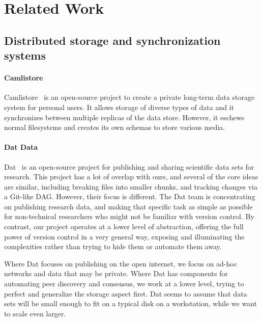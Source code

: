\section{Related Work}


\subsection{Distributed storage and synchronization systems}


\paragraph{Camlistore}

Camlistore~\cite{camlistore_homepage} is an open-source project to create a private long-term data storage system for personal users.
It allows storage of diverse types of data and it synchronizes between multiple replicas of the data store.
However, it eschews normal filesystems and creates its own schemas to store various media.


\paragraph{Dat Data}

Dat~\cite{dat_homepage} is an open-source project for publishing and sharing scientific data sets for research.
This project has a lot of overlap with ours, and several of the core ideas are similar, including breaking files into smaller chunks, and tracking changes via a Git-like \gls{DAG}.
However, their focus is different.
The Dat team is concentrating on publishing research data, and making that specific task as simple as possible for non-technical researchers who might not be familiar with version control.
By contrast, our project operates at a lower level of abstraction, offering the full power of version control in a very general way, exposing and illuminating the complexities rather than trying to hide them or automate them away.

Where Dat focuses on publishing on the open internet, we focus on ad-hoc networks and data that may be private.
Where Dat has components for automating peer discovery and consensus, we work at a lower level, trying to perfect and generalize the storage aspect first.
Dat seems to assume that data sets will be small enough to fit on a typical disk on a workstation, while we want to scale even larger.

